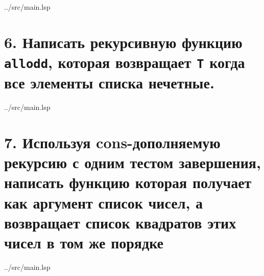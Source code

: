 \begin{lstinputlisting}[
	caption={Задание 5},
	label={lst:t5},
	style={lsp},
	linerange={24-27},
	]{../src/main.lsp}
\end{lstinputlisting}

\section*{6. Написать рекурсивную функцию \texttt{allodd}, которая возвращает \texttt{T} когда все элементы списка нечетные.}

\begin{lstinputlisting}[
	caption={Задание 6},
	label={lst:t6},
	style={lsp},
	linerange={29-32},
	]{../src/main.lsp}
\end{lstinputlisting}

\section*{7. Используя cons-дополняемую рекурсию с одним тестом завершения,	написать функцию которая получает как аргумент список чисел, а возвращает список квадратов этих чисел в том же порядке}

\begin{lstinputlisting}[
	caption={Задание 7},
	label={lst:t7},
	style={lsp},
	linerange={34-36},
	]{../src/main.lsp}
\end{lstinputlisting}

